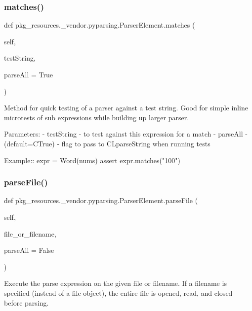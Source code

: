 \subsubsection{\texorpdfstring{matches()}{matches()}}
{\footnotesize\ttfamily def pkg\+\_\+resources.\+\_\+vendor.\+pyparsing.\+Parser\+Element.\+matches (\begin{DoxyParamCaption}\item[{}]{self,  }\item[{}]{test\+String,  }\item[{}]{parse\+All = {\ttfamily True} }\end{DoxyParamCaption})}

\begin{DoxyVerb}Method for quick testing of a parser against a test string. Good for simple 
inline microtests of sub expressions while building up larger parser.
   
Parameters:
 - testString - to test against this expression for a match
 - parseAll - (default=C{True}) - flag to pass to C{L{parseString}} when running tests
    
Example::
    expr = Word(nums)
    assert expr.matches("100")
\end{DoxyVerb}
 \mbox{\label{classpkg__resources_1_1__vendor_1_1pyparsing_1_1ParserElement_a58920492aecac3860b5013ea35bdca1d}} 
\subsubsection{\texorpdfstring{parse\+File()}{parseFile()}}
{\footnotesize\ttfamily def pkg\+\_\+resources.\+\_\+vendor.\+pyparsing.\+Parser\+Element.\+parse\+File (\begin{DoxyParamCaption}\item[{}]{self,  }\item[{}]{file\+\_\+or\+\_\+filename,  }\item[{}]{parse\+All = {\ttfamily False} }\end{DoxyParamCaption})}

\begin{DoxyVerb}Execute the parse expression on the given file or filename.
If a filename is specified (instead of a file object),
the entire file is opened, read, and closed before parsing.
\end{DoxyVerb}
 \mbox{\label{classpkg__resources_1_1__vendor_1_1pyparsing_1_1ParserElement_a8c5c41d249afece0b9418dbfefcf654b}} 
